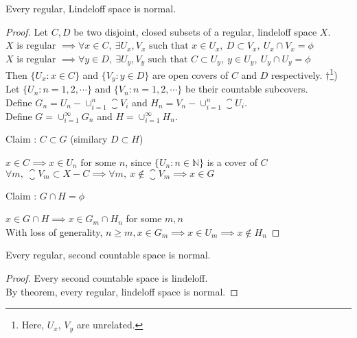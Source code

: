 \begin{theorem}
	Every regular, Lindeloff space is normal.
\end{theorem}
\begin{proof}
	Let $C,D$ be two disjoint, closed subsets of a regular, lindeloff space $X$.\\
	$X$ is regular $\implies \forall x \in C,\ \exists U_x, V_x \text{ such that } x \in U_x,\ D \subset V_x,\ U_x \cap V_x = \phi$\\
	$X$ is regular $\implies \forall y \in D,\ \exists U_y, V_y \text{ such that } C \subset U_y,\ y \in U_y,\ U_y \cap U_y = \phi$\\
	Then $\{ U_x : x \in C \}$ and $\{ V_y : y \in D \}$ are open covers of $C$ and $D$ respectively.
	$\dag$\footnote{Here, $U_x$, $V_y$ are unrelated.})\\
	Let $\{ U_n : n = 1,2,\cdots \}$ and $\{ V_n : n = 1,2,\cdots \}$ be their countable subcovers.\\
	Define $G_n = U_n - \cup_{i = 1}^n \closure{V_i}$ and $H_n = V_n - \cup_{i = 1}^n \closure{U_i}$.\\
	Define $G = \cup_{i = 1}^\infty G_n$ and $H = \cup_{i = 1}^\infty H_n$.\\
	\begin{important}
	Claim : $C \subset G$ (similary $D \subset H$)\\
	\end{important}
	$ x \in C \implies x \in U_n \text{ for some } n$, since $\{ U_n : n \in \mathbb{N} \}$ is a cover of $C$\\
	$\forall m,\ \closure{V_m} \subset X-C \implies \forall m,\ x \not\in \closure{V_m} \implies x \in G$\\
	\begin{important}
	Claim : $G \cap H = \phi$\\
	\end{important}
	$x \in G \cap H \implies x \in G_m \cap H_n$ for some $m,n$\\
	With loss of generality, $n \ge m, x \in G_m \implies x \in U_m \implies x \not\in H_n$
\end{proof}

\begin{corollary}
	Every regular, second countable space is normal.
\end{corollary}
\begin{proof}
	Every second countable space is lindeloff.\\
	By theorem, every regular, lindeloff space is normal.
\end{proof}

